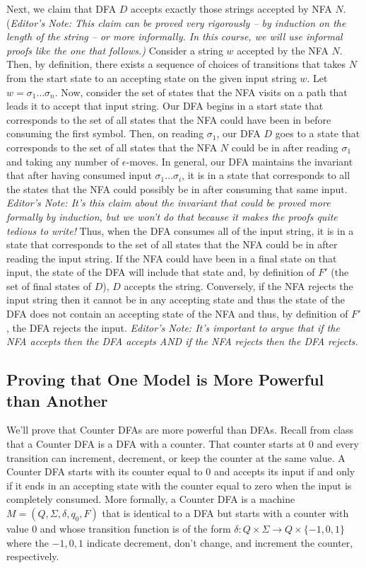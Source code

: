 \documentclass[12pt]{article}
\begin{document}
Next, we claim that DFA $D$ accepts exactly those strings accepted by NFA $N$.  (\emph{Editor's Note:  This claim can be proved very rigorously -- by induction on the length of the string --  or more informally.  In this course, we will use informal proofs like the one that follows.)} Consider a string $w$ accepted by the NFA $N$.  
	Then, by definition, there exists a sequence of choices of transitions that takes $N$ from the start state to an accepting state on the given input string $w$.    
	Let $w = \sigma_1 \dots \sigma_n$.  
	Now, consider the set of states that the NFA visits on a path that leads it to accept that input string.
	Our DFA begins in a start state that corresponds to the set of all states that the NFA could have been in before consuming the first symbol.  Then, on reading $\sigma_1$, our DFA $D$ goes to a state that corresponds to the set of all states that the NFA $N$ could be in after reading $\sigma_1$ and taking any number of $\epsilon$-moves.  In general, our DFA maintains the invariant that after having consumed input $\sigma_1 \dots \sigma_i$, it is in a state that corresponds to all the states that the NFA could possibly be in after consuming that same input.  
	\emph{Editor's Note:  It's this claim about the invariant that could be proved more formally by induction, but we won't do that because it makes the proofs quite tedious to write!}  Thus, 
	when the DFA consumes all of the input string, it is in a state that corresponds to the set of all states that the NFA could be in after reading the input string.  If the NFA could have been in a final state on that input, the state of the DFA will include that state and, by definition of $F'$ (the set of final states of $D$), $D$ accepts the string.  Conversely, if the NFA rejects the input string then it cannot be in any accepting state and thus the state of the DFA does not contain an accepting state of the NFA and thus, by definition of $F'$, the DFA rejects the input.  
	\emph{Editor's Note:  It's important to argue that if the NFA accepts then the DFA accepts AND if the NFA rejects then the DFA rejects.}

\subsection{Proving that One Model is More Powerful than Another}

We'll prove that Counter DFAs are more powerful than DFAs.  Recall from class that a Counter DFA is a DFA with a counter.   That counter starts at 0 and every transition can increment, decrement, or keep the counter at the same value.  A Counter DFA starts with its counter equal to 0 and accepts its input if and only if it ends in an accepting state with the counter equal to zero when the input is completely consumed.  More formally, a Counter DFA is a machine $M = (Q, \Sigma, \delta, q_0, F)$ that is identical to a DFA but starts with a counter with value 0 and whose transition function is of the form 
	$\delta: Q \times \Sigma \rightarrow Q \times \{ -1, 0, 1 \}$ 
	where the $-1, 0, 1$ indicate decrement, don't change, and increment the counter, respectively.  
\end{document}
